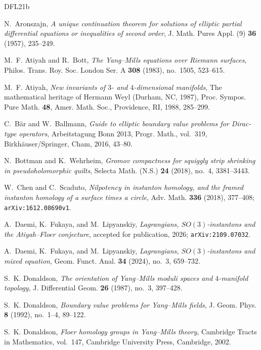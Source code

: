 \documentclass[11pt]{amsart}
\theoremstyle{definition}
\theoremstyle{remark}
\theoremstyle{plain}
\begin{document}
\clearpage
\begin{thebibliography}{DFL21b}

 N.~Aronszajn,
\emph{A unique continuation theorem for solutions of elliptic partial
differential equations or inequalities of second order},
J. Math. Pures Appl. (9) \textbf{36} (1957), 235--249.

 M.~F. Atiyah and R.~Bott,
\emph{The Yang--Mills equations over Riemann surfaces}, Philos. Trans.
Roy. Soc. London Ser. A \textbf{308} (1983), no.~1505, 523--615.

 M.~F. Atiyah, \emph{New invariants of
$3$- and $4$-dimensional manifolds}, The mathematical heritage of Hermann
Weyl (Durham, NC, 1987), Proc. Sympos. Pure Math. \textbf{48}, Amer. Math.
Soc., Providence, RI, 1988, 285--299.

 C.~B\"ar and W.~Ballmann,
\emph{Guide to elliptic boundary value problems for Dirac-type operators},
Arbeitstagung Bonn 2013, Progr. Math., vol.~319, Birkh\"auser/Springer,
Cham, 2016, 43--80.

 N.~Bottman and K.~Wehrheim,
\emph{Gromov compactness for squiggly strip shrinking in pseudoholomorphic
quilts}, Selecta Math. (N.S.) \textbf{24} (2018), no.~4, 3381--3443.

 W.~Chen and C.~Scaduto,
\emph{Nilpotency in instanton homology, and the framed instanton
homology of a surface times a circle}, Adv. Math. \textbf{336}
(2018), 377--408; \texttt{arXiv:1612.08690v1}.

 A.~Daemi, K.~Fukaya, and M.~Lipyanskiy,
\emph{Lagrangians, $SO(3)$-instantons and the Atiyah--Floer conjecture},
accepted for publication, 2026; \texttt{arXiv:2109.07032}.

 A.~Daemi, K.~Fukaya, and M.~Lipyanskiy,
\emph{Lagrangians, $SO(3)$-instantons and mixed equation},
Geom. Funct. Anal. \textbf{34} (2024), no.~3, 659--732.

 S.~K. Donaldson,
\emph{The orientation of Yang--Mills moduli spaces and
$4$-manifold topology}, J. Differential Geom.
\textbf{26} (1987), no.~3, 397--428.

 S.~K. Donaldson, \emph{Boundary value
problems for Yang--Mills fields}, J. Geom. Phys. \textbf{8} (1992),
no.~1--4, 89--122.

 S.~K. Donaldson,
\emph{Floer homology groups in Yang--Mills theory},
Cambridge Tracts in Mathematics, vol.~147,
Cambridge University Press, Cambridge, 2002.


\end{thebibliography}
\end{document}
